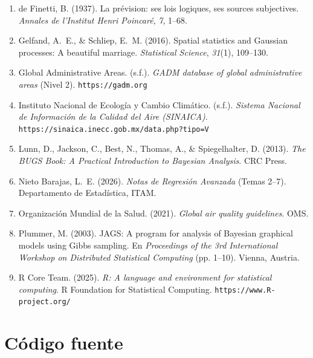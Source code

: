 ﻿\documentclass[12pt]{article}
\begin{document}
\begin{enumerate}
  \item de Finetti, B. (1937).
        La pr\'evision: ses lois logiques, ses sources subjectives.
        \textit{Annales de l'Institut Henri Poincar\'e}, \textit{7}, 1--68.

  \item Gelfand, A.~E., \& Schliep, E.~M. (2016).
        Spatial statistics and Gaussian processes: A beautiful marriage.
        \textit{Statistical Science}, \textit{31}(1), 109--130.

  \item Global Administrative Areas. (s.f.).
        \textit{GADM database of global administrative areas} (Nivel 2).
        \texttt{https://gadm.org}

  \item Instituto Nacional de Ecolog\'ia y Cambio Clim\'atico. (s.f.).
        \textit{Sistema Nacional de Informaci\'on de la Calidad del Aire (SINAICA)}.
        \texttt{https://sinaica.inecc.gob.mx/data.php?tipo=V}

  \item Lunn, D., Jackson, C., Best, N., Thomas, A., \& Spiegelhalter, D. (2013).
        \textit{The BUGS Book: A Practical Introduction to Bayesian Analysis}.
        CRC Press.

  \item Nieto Barajas, L.~E. (2026).
        \textit{Notas de Regresi\'on Avanzada} (Temas 2--7).
        Departamento de Estad\'istica, ITAM.

  \item Organizaci\'on Mundial de la Salud. (2021).
        \textit{Global air quality guidelines}.
        OMS.

  \item Plummer, M. (2003).
        JAGS: A program for analysis of Bayesian graphical models using Gibbs
        sampling.
        En \textit{Proceedings of the 3rd International Workshop on Distributed
        Statistical Computing} (pp. 1--10). Vienna, Austria.

  \item R Core Team. (2025).
        \textit{R: A language and environment for statistical computing}.
        R Foundation for Statistical Computing.
        \texttt{https://www.R-project.org/}
\end{enumerate}


\appendix
\section{C\'odigo fuente}
\end{document}
